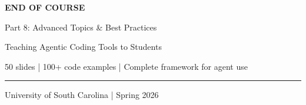 \documentclass[aspectratio=169,11pt]{beamer}
\begin{document}
\begin{frame}[plain]
    \centering
    \vspace{2cm}
    {\Huge\textcolor{UofSCGarnet}{\textbf{END OF COURSE}}}

    \vspace{1cm}
    {\Large Part 8: Advanced Topics \& Best Practices}

    \vspace{0.5cm}
    {\large Teaching Agentic Coding Tools to Students}

    \vspace{1cm}
    \textcolor{UofSC70Black}{50 slides | 100+ code examples | Complete framework for agent use}

    \vspace{1.5cm}
    \textcolor{UofSCGarnet}{\rule{8cm}{2pt}}

    \vspace{0.5cm}
    {\small University of South Carolina | Spring 2026}
\end{frame}
\end{document}
